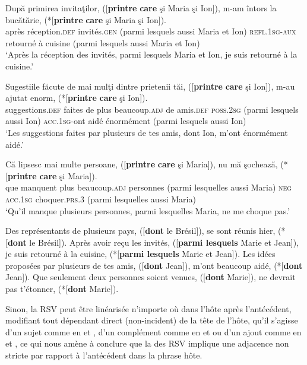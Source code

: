 \ex 
\gll După  primirea  invitaţilor,  ([\textbf{printre} \textbf{care} şi  Maria şi  Ion]), m-am  întors  la bucătărie,  (*[\textbf{printre} \textbf{care} şi  Maria şi  Ion]). \label{ch3:ex45b}\\
après  réception.\textsc{def}  invités.\textsc{gen}  (parmi  lesquels  aussi  Maria  et  Ion) \textsc{refl.1sg-aux}  retourné  à  cuisine  (parmi  lesquels  aussi  Maria  et  Ion) \\
\glt ‘Après la réception des invités, parmi lesquels Maria et Ion, je suis retourné à la cuisine.’

\ex 
\gll Sugestiile  făcute  de  mai  mulţi  dintre  prietenii  tăi, ([\textbf{printre}  \textbf{care}  şi  Ion]),  m-au  ajutat  enorm,  (*[\textbf{printre}  \textbf{care}  şi  Ion]). \label{ch3:ex45c}\\
suggestions.\textsc{def}  faites  de  plus  beaucoup.\textsc{adj}  de  amis.\textsc{def}  \textsc{poss.2sg} (parmi  lesquels  aussi  Ion)  \textsc{acc.1sg}{}-ont  aidé  énormément  (parmi
 lesquels  aussi  Ion) \\
\glt ‘Les suggestions faites par plusieurs de tes amis, dont Ion, m’ont énormément aidé.’

\ex 
\gll Că  lipsesc  mai  multe  persoane,  ([\textbf{printre} \textbf{care} şi  Maria]), nu  mă  şochează, (*[\textbf{printre} \textbf{care} şi  Maria]). \label{ch3:ex45d}\\
que  manquent  plus  beaucoup.\textsc{adj}  personnes  (parmi lesquelles  aussi  Maria) \textsc{neg} \textsc{acc.1sg}  choquer.\textsc{prs.3}  (parmi  lesquelles  aussi  Maria) \\
\glt ‘Qu’il manque plusieurs personnes, parmi lesquelles Maria, ne me choque pas.’
\z 
\z 


\ea \label{ch3:ex46} 
\ea 
Des représentants de plusieurs pays, ([\textbf{dont} le Brésil]), se sont réunis hier, (*[\textbf{dont} le Brésil]). \label{ch3:ex46a} 
\ex
Après avoir reçu les invités, ([\textbf{parmi lesquels} Marie et Jean]), je suis retourné à la cuisine, (*[\textbf{parmi lesquels} Marie et Jean]). \label{ch3:ex46b}
\ex 
Les idées proposées par plusieurs de tes amis, ([\textbf{dont} Jean]), m’ont beaucoup aidé, (*[\textbf{dont} Jean]). \label{ch3:ex46c}
\ex 
Que seulement deux personnes soient venues, ([\textbf{dont} Marie]), ne devrait pas t’étonner, (*[\textbf{dont} Marie]). \label{ch3:ex46d}
\z 
\z 

Sinon, la RSV peut être linéarisée n’importe où dans l’hôte après l’antécédent, modifiant tout dépendant direct (non-incident) de la tête de l’hôte, qu’il s’agisse d’un sujet comme en  et , d’un complément comme en  et  ou d’un ajout comme en  et , ce qui nous amène à conclure que la  des RSV implique une adjacence non stricte par rapport à l’antécédent dans la phrase hôte.

